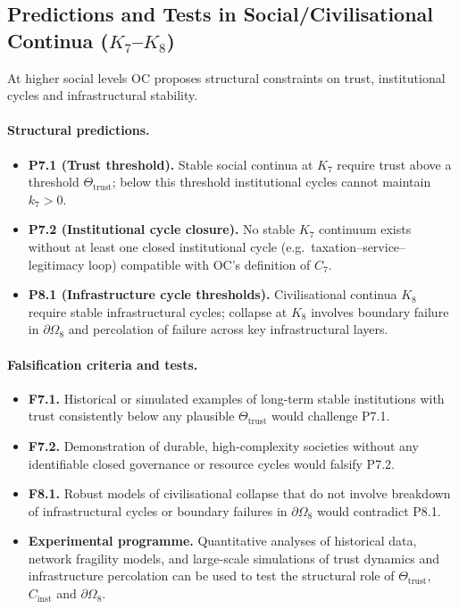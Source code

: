 \subsection{Predictions and Tests in Social/Civilisational Continua
            (\texorpdfstring{$K_7$}{K\_7}--\texorpdfstring{$K_8$}{K\_8})}

At higher social levels OC proposes structural constraints on trust,
institutional cycles and infrastructural stability.

\paragraph{Structural predictions.}
\begin{itemize}
  \item \textbf{P7.1 (Trust threshold).}
        Stable social continua at \(K_7\) require trust above a threshold
        \(\Theta_{\mathrm{trust}}\); below this threshold institutional
        cycles cannot maintain \(k_7>0\).
  \item \textbf{P7.2 (Institutional cycle closure).}
        No stable \(K_7\) continuum exists without at least one closed
        institutional cycle (e.g.\ taxation–service–legitimacy loop)
        compatible with OC’s definition of \(C_7\).
  \item \textbf{P8.1 (Infrastructure cycle thresholds).}
        Civilisational continua \(K_8\) require stable infrastructural
        cycles; collapse at \(K_8\) involves boundary failure in
        \(\partial\Omega_8\) and percolation of failure across key
        infrastructural layers.
\end{itemize}

\paragraph{Falsification criteria and tests.}
\begin{itemize}
  \item \textbf{F7.1.}
        Historical or simulated examples of long-term stable institutions
        with trust consistently below any plausible
        \(\Theta_{\mathrm{trust}}\) would challenge P7.1.
  \item \textbf{F7.2.}
        Demonstration of durable, high-complexity societies without any
        identifiable closed governance or resource cycles would falsify
        P7.2.
  \item \textbf{F8.1.}
        Robust models of civilisational collapse that do not involve
        breakdown of infrastructural cycles or boundary failures in
        \(\partial\Omega_8\) would contradict P8.1.
  \item \textbf{Experimental programme.}
        Quantitative analyses of historical data, network fragility models,
        and large-scale simulations of trust dynamics and infrastructure
        percolation can be used to test the structural role of
        \(\Theta_{\mathrm{trust}}\), \(C_{\mathrm{inst}}\) and
        \(\partial\Omega_8\).
\end{itemize}

